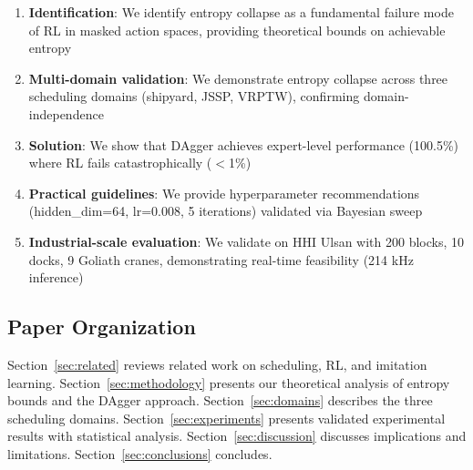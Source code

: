 \begin{enumerate}
    \item \textbf{Identification}: We identify entropy collapse as a fundamental failure mode of RL in masked action spaces, providing theoretical bounds on achievable entropy

    \item \textbf{Multi-domain validation}: We demonstrate entropy collapse across three scheduling domains (shipyard, JSSP, VRPTW), confirming domain-independence

    \item \textbf{Solution}: We show that DAgger achieves expert-level performance (100.5\%) where RL fails catastrophically ($<$1\%)

    \item \textbf{Practical guidelines}: We provide hyperparameter recommendations (hidden\_dim=64, lr=0.008, 5 iterations) validated via Bayesian sweep

    \item \textbf{Industrial-scale evaluation}: We validate on HHI Ulsan with 200 blocks, 10 docks, 9 Goliath cranes, demonstrating real-time feasibility (214 kHz inference)
\end{enumerate}

\subsection{Paper Organization}

Section~\ref{sec:related} reviews related work on scheduling, RL, and imitation learning. Section~\ref{sec:methodology} presents our theoretical analysis of entropy bounds and the DAgger approach. Section~\ref{sec:domains} describes the three scheduling domains. Section~\ref{sec:experiments} presents validated experimental results with statistical analysis. Section~\ref{sec:discussion} discusses implications and limitations. Section~\ref{sec:conclusions} concludes.


